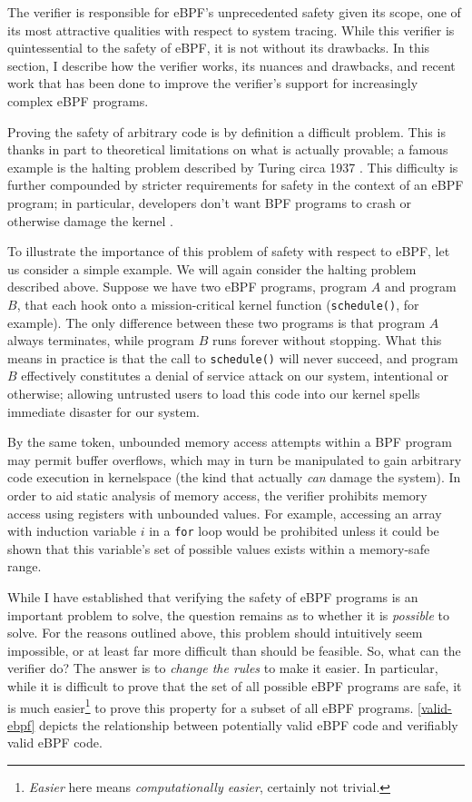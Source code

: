 \documentclass[
  12pt]{findlay}
\newcommand{\passthrough}[1]{#1}
\begin{document}
\label{verifier-section}

The verifier is responsible for eBPF's unprecedented safety given its
scope, one of its most attractive qualities with respect to system
tracing. While this verifier is quintessential to the safety of eBPF, it
is not without its drawbacks. In this section, I describe how the
verifier works, its nuances and drawbacks, and recent work that has been
done to improve the verifier's support for increasingly complex eBPF
programs.

Proving the safety of arbitrary code is by definition a difficult
problem. This is thanks in part to theoretical limitations on what is
actually provable; a famous example is the halting problem described by
Turing circa 1937 \autocite{turing37}. This difficulty is further
compounded by stricter requirements for safety in the context of an eBPF
program; in particular, developers don't want BPF programs to crash or
otherwise damage the kernel \autocite{fleming17}.

To illustrate the importance of this problem of safety with respect to
eBPF, let us consider a simple example. We will again consider the
halting problem described above. Suppose we have two eBPF programs,
program \(A\) and program \(B\), that each hook onto a mission-critical
kernel function (\passthrough{\lstinline!schedule()!}, for example). The
only difference between these two programs is that program \(A\) always
terminates, while program \(B\) runs forever without stopping. What this
means in practice is that the call to
\passthrough{\lstinline!schedule()!} will never succeed, and program
\(B\) effectively constitutes a denial of service attack
\autocite{hussain03} on our system, intentional or otherwise; allowing
untrusted users to load this code into our kernel spells immediate
disaster for our system.

By the same token, unbounded memory access attempts within a BPF program
may permit buffer overflows, which may in turn be manipulated to gain
arbitrary code execution in kernelspace \autocite{chen11} (the kind that
actually \emph{can} damage the system). In order to aid static analysis
of memory access, the verifier prohibits memory access using registers
with unbounded values. For example, accessing an array with induction
variable \(i\) in a \passthrough{\lstinline!for!} loop would be
prohibited unless it could be shown that this variable's set of possible
values exists within a memory-safe range.

While I have established that verifying the safety of eBPF programs is
an important problem to solve, the question remains as to whether it is
\emph{possible} to solve. For the reasons outlined above, this problem
should intuitively seem impossible, or at least far more difficult than
should be feasible. So, what can the verifier do? The answer is to
\emph{change the rules} to make it easier. In particular, while it is
difficult to prove that the set of all possible eBPF programs are safe,
it is much easier\footnote{\emph{Easier}
here means \emph{computationally easier}, certainly not trivial.} to
prove this property for a subset of all eBPF programs.
\autoref{valid-ebpf} depicts the relationship between potentially valid
eBPF code and verifiably valid eBPF code.
\end{document}
